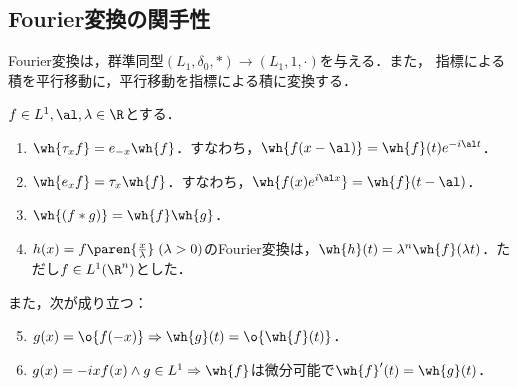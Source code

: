 \documentclass[uplatex,dvipdfmx]{jsreport}
\begin{document}
\subsection{Fourier変換の関手性}

\begin{tcolorbox}[colframe=ForestGreen, colback=ForestGreen!10!white,breakable,colbacktitle=ForestGreen!40!white,coltitle=black,fonttitle=\bfseries\sffamily,
title=]
    Fourier変換は，群準同型$(L_1,\delta_0,*)\to(L_1,1,\cdot)$を与える．また，
    指標による積を平行移動に，平行移動を指標による積に変換する．
\end{tcolorbox}

\begin{theorem}[Fourier変換の関手性]
    $f\in L^1,\al,\lambda\in\R$とする．
    \begin{enumerate}
        \item $\wh{\tau_xf}=e_{-x}\wh{f}$．すなわち，$\wh{f(x-\al)}=\wh{f}(t)e^{-i\al t}$．
        \item $\wh{e_xf}=\tau_x\wh{f}$．すなわち，$\wh{f(x)e^{i\al x}}=\wh{f}(t-\al)$．
        \item $\wh{(f*g)}=\wh{f}\wh{g}$．
        \item $h(x)=f\paren{\frac{x}{\lambda}}\;(\lambda>0)$のFourier変換は，$\wh{h}(t)=\lambda^n\wh{f}(\lambda t)$．ただし$f\in L^1(\R^n)$とした．
    \end{enumerate}
    また，次が成り立つ：
    \begin{enumerate}\setcounter{enumi}{4}
        \item $g(x)=\o{f(-x)}\Rightarrow\wh{g}(t)=\o{\wh{f}(t)}$．
        \item $g(x)=-ixf(x)\land g\in L^1\Rightarrow\wh{f}$は微分可能で$\wh{f}'(t)=\wh{g}(t)$．
    \end{enumerate}
\end{theorem}
\end{document}

